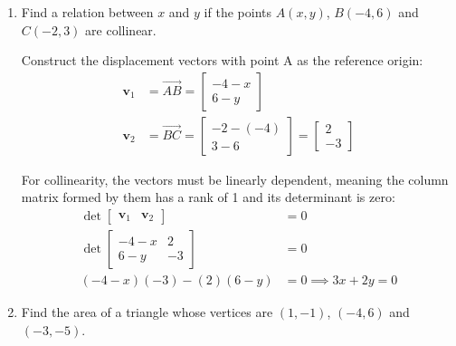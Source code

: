\begin{enumerate}[label=\thesubsection.\arabic*, ref=\thesubsection.\theenumi]
	The probability of selecting a green marble is also given by the ratio of green marbles to total marbles:
	\begin{align*}
		P(\text{green}) &= \frac{\text{Number of green marbles}}{\text{Total number of marbles}} \implies 
		\frac{11}{20} = \frac{11}{n} \implies
		n = 20
	\end{align*}
	
	
	
	
	
	\item  Find a relation between $x$ and $y$ if the points
	$A(x,y)$, $B(-4,6)$ and $C(-2,3)$ are collinear.
	
	\solution
	Construct the displacement vectors with point A as the reference origin:
	\begin{align*}
		\mathbf{v}_1 &= \vec{AB} = \begin{bmatrix} -4 - x \\ 6 - y \end{bmatrix} \\
		\mathbf{v}_2 &= \vec{BC} = \begin{bmatrix} -2 - (-4) \\ 3 - 6 \end{bmatrix} = \begin{bmatrix} 2 \\ -3 \end{bmatrix}
	\end{align*}
	
	For collinearity, the vectors must be linearly dependent, meaning the column matrix formed by them has a rank of 1 and its determinant is zero:
	\begin{align*}
		\det \begin{bmatrix} \mathbf{v}_1 & \mathbf{v}_2 \end{bmatrix} &= 0 \\
		\det \begin{bmatrix} -4 - x & 2 \\ 6 - y & -3 \end{bmatrix} &= 0 \\
		(-4 - x)(-3) - (2)(6 - y) &= 0 \implies 3x + 2y = 0
	\end{align*}
	
	\item Find the area of a triangle whose vertices are
	$(1,-1)$, $(-4,6)$ and $(-3,-5)$.
	

\end{enumerate}
